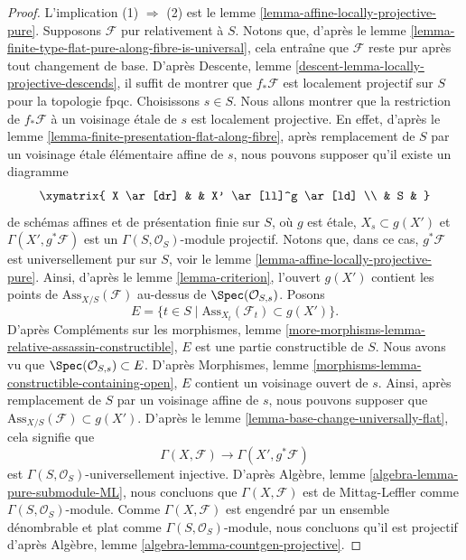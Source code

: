 \begin{proof}
L'implication (1) $\Rightarrow$ (2) est le
lemme \ref{lemma-affine-locally-projective-pure}.
Supposons $\mathcal{F}$ pur relativement à $S$.
Notons que, d'après le
lemme \ref{lemma-finite-type-flat-pure-along-fibre-is-universal},
cela entraîne que $\mathcal{F}$ reste pur après tout changement de base. D'après
Descente, lemme \ref{descent-lemma-locally-projective-descends},
il suffit de montrer que $f_*\mathcal{F}$ est localement projectif sur $S$ pour la topologie fpqc.
Choisissons $s \in S$. Nous allons montrer que la restriction de
$f_*\mathcal{F}$ à un voisinage \'etale de $s$ est localement projective.
En effet, d'après le
lemme \ref{lemma-finite-presentation-flat-along-fibre},
après remplacement de $S$ par un voisinage \'etale élémentaire affine
de $s$, nous pouvons supposer qu'il existe un diagramme
$$
\xymatrix{
X \ar[dr] & & X' \ar[ll]^g \ar[ld] \\
& S &
}
$$
de schémas affines et de présentation finie sur $S$,
où $g$ est \'etale, $X_s \subset g(X')$ et
$\Gamma(X', g^*\mathcal{F})$ est un $\Gamma(S, \mathcal{O}_S)$-module projectif.
Notons que, dans ce cas, $g^*\mathcal{F}$ est universellement pur sur $S$, voir le
lemme \ref{lemma-affine-locally-projective-pure}.
Ainsi, d'après le
lemme \ref{lemma-criterion},
l'ouvert $g(X')$ contient les points de
$\text{Ass}_{X/S}(\mathcal{F})$ au-dessus de $\Spec(\mathcal{O}_{S, s})$.
Posons
$$
E = \{t \in S \mid \text{Ass}_{X_t}(\mathcal{F}_t) \subset g(X') \}.
$$
D'après
Compléments sur les morphismes,
lemme \ref{more-morphisms-lemma-relative-assassin-constructible},
$E$ est une partie constructible de $S$. Nous avons vu que
$\Spec(\mathcal{O}_{S, s}) \subset E$. D'après
Morphismes, lemme \ref{morphisms-lemma-constructible-containing-open},
$E$ contient un voisinage ouvert de $s$. Ainsi, après
remplacement de $S$ par un voisinage affine de $s$, nous pouvons supposer que
$\text{Ass}_{X/S}(\mathcal{F}) \subset g(X')$.
D'après le
lemme \ref{lemma-base-change-universally-flat},
cela signifie que
$$
\Gamma(X, \mathcal{F}) \longrightarrow \Gamma(X', g^*\mathcal{F})
$$
est $\Gamma(S, \mathcal{O}_S)$-universellement injective.\newline
D'après Algèbre, lemme \ref{algebra-lemma-pure-submodule-ML},
nous concluons que $\Gamma(X, \mathcal{F})$ est de Mittag-Leffler comme
$\Gamma(S, \mathcal{O}_S)$-module. Comme
$\Gamma(X, \mathcal{F})$ est engendré par un ensemble dénombrable et plat comme
$\Gamma(S, \mathcal{O}_S)$-module, nous concluons
qu'il est projectif d'après
Algèbre, lemme \ref{algebra-lemma-countgen-projective}.
\end{proof}

